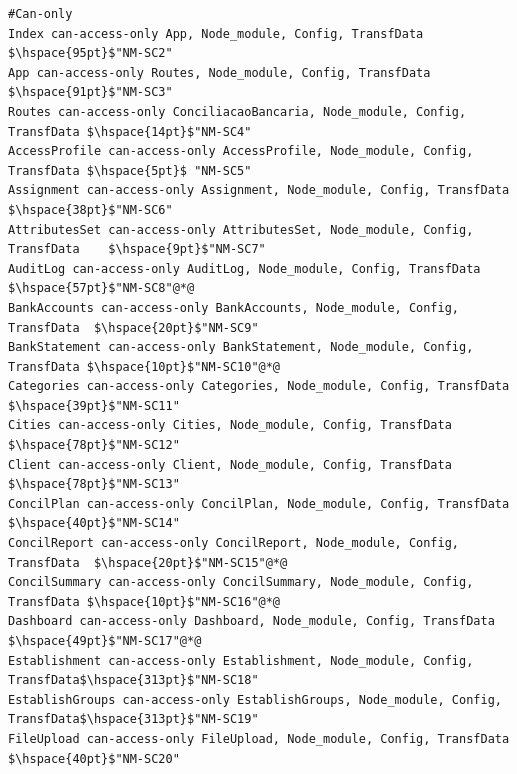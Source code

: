 \documentclass[12pt]{article}
\begin{document}
\begin{lstlisting}[style=colorido, caption={Especificação do Projeto Arquitetural do orquestrador Node-Middle.},label={list:especArquiteturalNodeMiddle}
]
#Can-only
Index can-access-only App, Node_module, Config, TransfData $\hspace{95pt}$"NM-SC2"
App can-access-only Routes, Node_module, Config, TransfData $\hspace{91pt}$"NM-SC3"
Routes can-access-only ConciliacaoBancaria, Node_module, Config, TransfData	$\hspace{14pt}$"NM-SC4"
AccessProfile can-access-only AccessProfile, Node_module, Config, TransfData $\hspace{5pt}$ "NM-SC5"
Assignment can-access-only Assignment, Node_module, Config, TransfData	$\hspace{38pt}$"NM-SC6"
AttributesSet can-access-only AttributesSet, Node_module, Config, TransfData	$\hspace{9pt}$"NM-SC7"
AuditLog can-access-only AuditLog, Node_module, Config, TransfData	$\hspace{57pt}$"NM-SC8"@*@
BankAccounts can-access-only BankAccounts, Node_module, Config, TransfData	$\hspace{20pt}$"NM-SC9"
BankStatement can-access-only BankStatement, Node_module, Config, TransfData $\hspace{10pt}$"NM-SC10"@*@
Categories can-access-only Categories, Node_module, Config, TransfData	$\hspace{39pt}$"NM-SC11"
Cities can-access-only Cities, Node_module, Config, TransfData $\hspace{78pt}$"NM-SC12"
Client can-access-only Client, Node_module, Config, TransfData $\hspace{78pt}$"NM-SC13"
ConcilPlan can-access-only ConcilPlan, Node_module, Config, TransfData $\hspace{40pt}$"NM-SC14"
ConcilReport can-access-only ConcilReport, Node_module, Config, TransfData	$\hspace{20pt}$"NM-SC15"@*@
ConcilSummary can-access-only ConcilSummary, Node_module, Config, TransfData $\hspace{10pt}$"NM-SC16"@*@
Dashboard can-access-only Dashboard, Node_module, Config, TransfData	$\hspace{49pt}$"NM-SC17"@*@
Establishment can-access-only Establishment, Node_module, Config, TransfData$\hspace{313pt}$"NM-SC18"
EstablishGroups can-access-only EstablishGroups, Node_module, Config, TransfData$\hspace{313pt}$"NM-SC19"
FileUpload can-access-only FileUpload, Node_module, Config, TransfData	$\hspace{40pt}$"NM-SC20"

\end{lstlisting}
\end{document}
